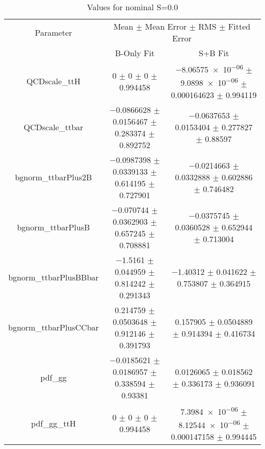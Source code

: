 \begin{table}
\centering
\caption{Values for nominal S=0.0}
\begin{tabular}{ccc}
\toprule
Parameter & \multicolumn{2}{c}{Mean $\pm$ Mean Error $\pm$ RMS $\pm$ Fitted Error}\\
 & B-Only Fit & S+B Fit\\
\midrule
QCDscale\_ttH & \num{0} $\pm$ \num{0} $\pm$ \num{0} $\pm$ \num{0.994458} & \num{-8.06575e-06} $\pm$ \num{9.0898e-06} $\pm$ \num{0.000164623} $\pm$ \num{0.994119}\\
QCDscale\_ttbar & \num{-0.0866628} $\pm$ \num{0.0156467} $\pm$ \num{0.283374} $\pm$ \num{0.892752} & \num{-0.0637653} $\pm$ \num{0.0153404} $\pm$ \num{0.277827} $\pm$ \num{0.88597}\\
bgnorm\_ttbarPlus2B & \num{-0.0987398} $\pm$ \num{0.0339133} $\pm$ \num{0.614195} $\pm$ \num{0.727901} & \num{-0.0214663} $\pm$ \num{0.0332888} $\pm$ \num{0.602886} $\pm$ \num{0.746482}\\
bgnorm\_ttbarPlusB & \num{-0.070744} $\pm$ \num{0.0362903} $\pm$ \num{0.657245} $\pm$ \num{0.708881} & \num{-0.0375745} $\pm$ \num{0.0360528} $\pm$ \num{0.652944} $\pm$ \num{0.713004}\\
bgnorm\_ttbarPlusBBbar & \num{-1.5161} $\pm$ \num{0.044959} $\pm$ \num{0.814242} $\pm$ \num{0.291343} & \num{-1.40312} $\pm$ \num{0.041622} $\pm$ \num{0.753807} $\pm$ \num{0.364915}\\
bgnorm\_ttbarPlusCCbar & \num{0.214759} $\pm$ \num{0.0503648} $\pm$ \num{0.912146} $\pm$ \num{0.391793} & \num{0.157905} $\pm$ \num{0.0504889} $\pm$ \num{0.914394} $\pm$ \num{0.416734}\\
pdf\_gg & \num{-0.0185621} $\pm$ \num{0.0186957} $\pm$ \num{0.338594} $\pm$ \num{0.93381} & \num{0.0126065} $\pm$ \num{0.018562} $\pm$ \num{0.336173} $\pm$ \num{0.936091}\\
pdf\_gg\_ttH & \num{0} $\pm$ \num{0} $\pm$ \num{0} $\pm$ \num{0.994458} & \num{7.3984e-06} $\pm$ \num{8.12544e-06} $\pm$ \num{0.000147158} $\pm$ \num{0.994445}\\
\bottomrule
\end{tabular}
\end{table}